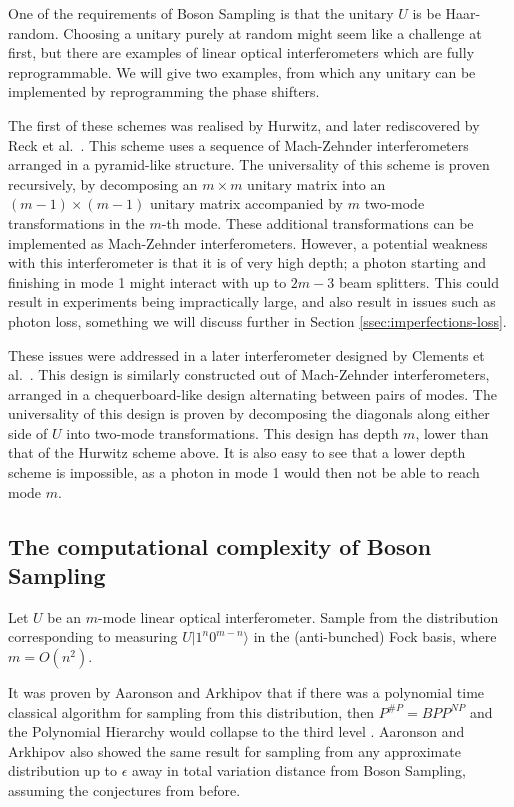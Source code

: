 One of the requirements of Boson Sampling is that the unitary $U$ is be Haar-random. Choosing a unitary purely at random might seem like a challenge at first, but there are examples of linear optical interferometers which are fully reprogrammable. We will give two examples, from which any unitary can be implemented by reprogramming the phase shifters.

The first of these schemes was realised by Hurwitz, and later rediscovered by Reck et al.~\cite{hurwitz1897, reck1994}. This scheme uses a sequence of Mach-Zehnder interferometers arranged in a pyramid-like structure. The universality of this scheme is proven recursively, by decomposing an $m\times m$ unitary matrix into an $(m-1)\times(m-1)$ unitary matrix accompanied by $m$ two-mode transformations in the $m$-th mode. These additional transformations can be implemented as Mach-Zehnder interferometers. However, a potential weakness with this interferometer is that it is of very high depth; a photon starting and finishing in mode 1 might interact with up to $2m-3$ beam splitters. This could result in experiments being impractically large, and also result in issues such as photon loss, something we will discuss further in Section \ref{ssec:imperfections-loss}.

These issues were addressed in a later interferometer designed by Clements et al.~\cite{clements2016}. This design is similarly constructed out of Mach-Zehnder interferometers, arranged in a chequerboard-like design alternating between pairs of modes. The universality of this design is proven by decomposing the diagonals along either side of $U$ into two-mode transformations. This design has depth $m$, lower than that of the Hurwitz scheme above. It is also easy to see that a lower depth scheme is impossible, as a photon in mode 1 would then not be able to reach mode $m$.

\subsection{The computational complexity of Boson Sampling}
\label{ssec:cc-bs}

\begin{problem} Let $U$ be an $m$-mode linear optical interferometer. Sample from the distribution corresponding to measuring $U|1^n0^{m-n}\rangle$ in the (anti-bunched) Fock basis, where $m=O(n^2)$.
\end{problem}

It was proven by Aaronson and Arkhipov that if there was a polynomial time classical algorithm for sampling from this distribution, then $P^{\#P} = BPP^{NP}$ and the Polynomial Hierarchy would collapse to the third level \cite{aaronson2011}. 
Aaronson and Arkhipov also showed the same result for sampling from any approximate distribution up to $\epsilon$ away in total variation distance from Boson Sampling, assuming the conjectures from before.

